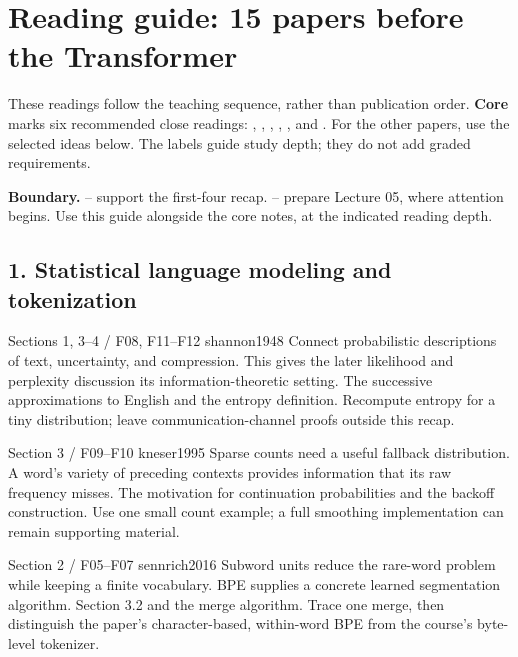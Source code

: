 \clearpage
\section{Reading guide: 15 papers before the Transformer}
\label{sec:readings}
These readings follow the teaching sequence, rather than publication order.
\textbf{Core} marks six recommended close readings: ,
, , , , and
. For the other papers, use the selected ideas below.
The labels guide study depth; they do not add graded requirements.

\textbf{Boundary.} -- support the first-four
recap. -- prepare Lecture 05, where attention
begins. Use this guide alongside the core notes, at the indicated reading depth.

\subsection{1. Statistical language modeling and tokenization}
  {Sections 1, 3--4 \quad / \quad F08, F11--F12}
  {shannon1948}
  {Connect probabilistic descriptions of text, uncertainty, and compression.
  This gives the later likelihood and perplexity discussion its information-theoretic setting.}
  {The successive approximations to English and the entropy definition.
  Recompute entropy for a tiny distribution; leave communication-channel
  proofs outside this recap.}

  {Section 3 \quad / \quad F09--F10}
  {kneser1995}
  {Sparse counts need a useful fallback distribution. A word's variety of
  preceding contexts provides information that its raw frequency misses.}
  {The motivation for continuation probabilities and the backoff construction.
  Use one small count example; a full smoothing implementation can remain
  supporting material.}

  {Section 2 \quad / \quad F05--F07}
  {sennrich2016}
  {Subword units reduce the rare-word problem while keeping a finite
  vocabulary. BPE supplies a concrete learned segmentation algorithm.}
  {Section 3.2 and the merge algorithm. Trace one merge, then distinguish
  the paper's character-based, within-word BPE from the course's byte-level
  tokenizer.}

